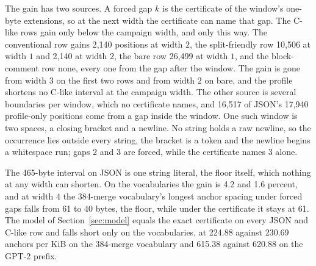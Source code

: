 \documentclass[11pt,a4paper]{article}
\theoremstyle{definition}
\theoremstyle{plain}
\begin{document}
The gain has two sources. A forced gap $k$ is the certificate of the window's one-byte extensions, so at the next width
the certificate can name that gap. The C-like rows gain only below the campaign width, and only this way. The
conventional row gains 2{,}140 positions at width $2$, the split-friendly row 10{,}506 at width $1$ and 2{,}140 at width
$2$, the bare row 26{,}499 at width $1$, and the block-comment row none, every one from the gap after the window. The
gain is gone from width $3$ on the first two rows and from width $2$ on bare, and the profile shortens no C-like
interval at the campaign width. The other source is several boundaries per window, which no certificate names, and
16{,}517 of JSON's 17{,}940 profile-only positions come from a gap inside the window. One such window is two spaces, a
closing bracket and a newline. No string holds a raw newline, so the occurrence lies outside every string, the bracket
is a token and the newline begins a whitespace run; gaps $2$ and $3$ are forced, while the certificate names $3$ alone.

The 465-byte interval on JSON is one string literal, the floor itself, which nothing at any width can shorten. On the
vocabularies the gain is 4.2 and 1.6 percent, and at width $4$ the 384-merge vocabulary's longest anchor spacing under
forced gaps falls from 61 to 40 bytes, the floor, while under the certificate it stays at 61. The model of
Section~\ref{sec:model} equals the exact certificate on every JSON and C-like row and falls short only on the
vocabularies, at 224.88 against 230.69 anchors per KiB on the 384-merge vocabulary and 615.38 against 620.88 on the
GPT-2 prefix.
\end{document}
